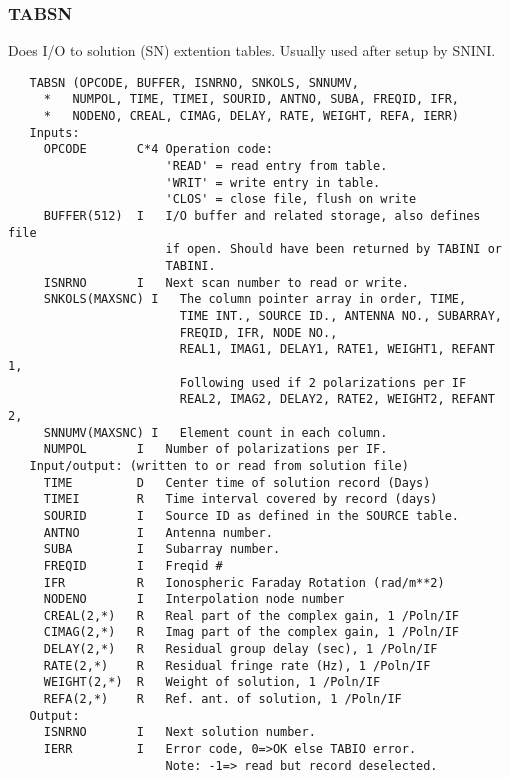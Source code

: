\subsubsection{TABSN}
Does I/O to solution (SN) extention tables. Usually used after
setup by SNINI.
\begin{verbatim}
   TABSN (OPCODE, BUFFER, ISNRNO, SNKOLS, SNNUMV,
     *   NUMPOL, TIME, TIMEI, SOURID, ANTNO, SUBA, FREQID, IFR,
     *   NODENO, CREAL, CIMAG, DELAY, RATE, WEIGHT, REFA, IERR)
   Inputs:
     OPCODE       C*4 Operation code:
                      'READ' = read entry from table.
                      'WRIT' = write entry in table.
                      'CLOS' = close file, flush on write
     BUFFER(512)  I   I/O buffer and related storage, also defines file
                      if open. Should have been returned by TABINI or
                      TABINI.
     ISNRNO       I   Next scan number to read or write.
     SNKOLS(MAXSNC) I   The column pointer array in order, TIME,
                        TIME INT., SOURCE ID., ANTENNA NO., SUBARRAY,
                        FREQID, IFR, NODE NO.,
                        REAL1, IMAG1, DELAY1, RATE1, WEIGHT1, REFANT 1,
                        Following used if 2 polarizations per IF
                        REAL2, IMAG2, DELAY2, RATE2, WEIGHT2, REFANT 2,
     SNNUMV(MAXSNC) I   Element count in each column.
     NUMPOL       I   Number of polarizations per IF.
   Input/output: (written to or read from solution file)
     TIME         D   Center time of solution record (Days)
     TIMEI        R   Time interval covered by record (days)
     SOURID       I   Source ID as defined in the SOURCE table.
     ANTNO        I   Antenna number.
     SUBA         I   Subarray number.
     FREQID       I   Freqid #
     IFR          R   Ionospheric Faraday Rotation (rad/m**2)
     NODENO       I   Interpolation node number
     CREAL(2,*)   R   Real part of the complex gain, 1 /Poln/IF
     CIMAG(2,*)   R   Imag part of the complex gain, 1 /Poln/IF
     DELAY(2,*)   R   Residual group delay (sec), 1 /Poln/IF
     RATE(2,*)    R   Residual fringe rate (Hz), 1 /Poln/IF
     WEIGHT(2,*)  R   Weight of solution, 1 /Poln/IF
     REFA(2,*)    R   Ref. ant. of solution, 1 /Poln/IF
   Output:
     ISNRNO       I   Next solution number.
     IERR         I   Error code, 0=>OK else TABIO error.
                      Note: -1=> read but record deselected.
\end{verbatim}

